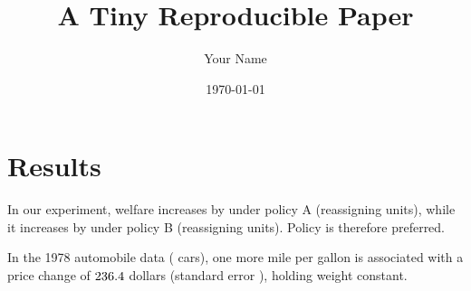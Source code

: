 \documentclass[11pt]{article}
\title{A Tiny Reproducible Paper}
\author{Your Name}
\date{\today}
\begin{document}
\maketitle

\section{Results}

In our experiment, welfare increases by \WelfareA{} under policy A
(reassigning \NReassA{} units), while it increases by \WelfareB{} under
policy B (reassigning \NReassB{} units). Policy \PreferredPolicy{} is
therefore preferred.

In the 1978 automobile data (\NObs{} cars), one more mile per gallon is
associated with a price change of $236.4$ dollars (standard error
\SeMpg), holding weight constant.
\end{document}
